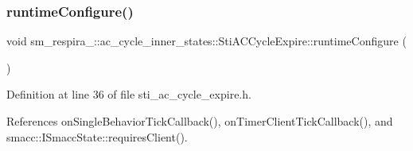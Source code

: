 \subsubsection{\texorpdfstring{runtime\+Configure()}{runtimeConfigure()}}
{\footnotesize\ttfamily void sm\+\_\+respira\+\_\+::ac\+\_\+cycle\+\_\+inner\+\_\+states\+::\+Sti\+A\+C\+Cycle\+Expire\+::runtime\+Configure (\begin{DoxyParamCaption}{ }\end{DoxyParamCaption})\hspace{0.3cm}{\ttfamily [inline]}}



Definition at line 36 of file sti\+\_\+ac\+\_\+cycle\+\_\+expire.\+h.



References on\+Single\+Behavior\+Tick\+Callback(), on\+Timer\+Client\+Tick\+Callback(), and smacc\+::\+I\+Smacc\+State\+::requires\+Client().


